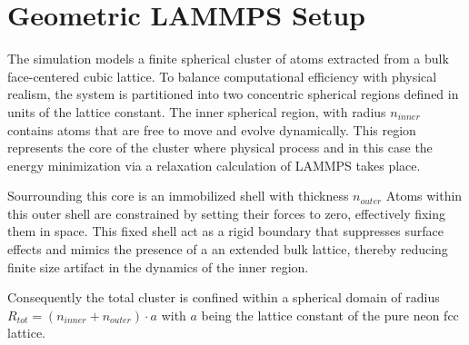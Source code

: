 \section{Geometric LAMMPS Setup}
The simulation models a finite spherical cluster of atoms extracted from a bulk face-centered cubic lattice. To balance computational efficiency with physical realism, the system is partitioned into two concentric spherical regions defined in units of the lattice constant. The inner spherical region, with radius $n_{inner}$ contains atoms that are free to move and evolve dynamically. This region represents the core of the cluster where physical process and in this case the energy minimization via a relaxation calculation of \ac{LAMMPS} takes place.

Sourrounding this core is an immobilized shell with thickness $n_{outer}$
Atoms within this outer shell are constrained by setting their forces to zero, effectively fixing them in space. This fixed shell act as a rigid boundary that suppresses surface effects and mimics the presence of a an extended bulk lattice, thereby reducing finite size artifact in the dynamics of the inner region.

Consequently the total cluster is confined within a spherical domain of radius $R_{tot}=(n_{inner}+n_{outer})\cdot a$ with $a$ being the lattice constant of the pure neon \ac{fcc} lattice. 

